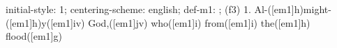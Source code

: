 initial-style: 1;
centering-scheme: english;
def-m1: \grealign;
(f3) 1. Al-([em1]h)might-([em1]h)y([em1]iv) God,([em1]jv) who([em1]i) from([em1]i) the([em1]h) flood([em1]g)